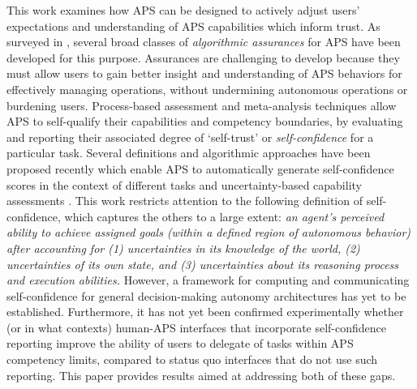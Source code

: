 This work examines how APS can be designed to actively adjust users' expectations and understanding of APS capabilities which inform trust. As surveyed in \cite{Israelsen2017-ym}, several broad classes of \emph{algorithmic assurances} for APS have been developed for this purpose. 
Assurances are challenging to develop because they must allow users to gain better insight and understanding of APS behaviors for effectively managing operations, without undermining autonomous operations or burdening users. 
Process-based assessment and meta-analysis techniques allow APS to self-qualify their capabilities and competency boundaries, by evaluating and reporting their associated degree of `self-trust' or \emph{self-confidence} for a particular task. 
Several definitions and algorithmic approaches have been proposed recently which enable APS to automatically generate self-confidence scores in the context of different tasks and uncertainty-based capability assessments \cite{Sweet2016-tz, Israelsen2017-ym}. This work restricts attention to the following definition of self-confidence, which captures the others to a large extent: \textit{an agent's perceived ability to achieve assigned goals (within a defined region of autonomous behavior) after accounting for (1) uncertainties in its knowledge of the world, (2) uncertainties of its own state, and (3) uncertainties about its reasoning process and execution abilities.} However, a framework for computing and communicating self-confidence for general decision-making autonomy architectures has yet to be established. Furthermore, it has not yet been confirmed experimentally whether (or in what contexts) human-APS interfaces that incorporate self-confidence reporting improve the ability of users to delegate of tasks within APS competency limits, compared to status quo interfaces that do not use such reporting. This paper provides results aimed at addressing both of these gaps. 


